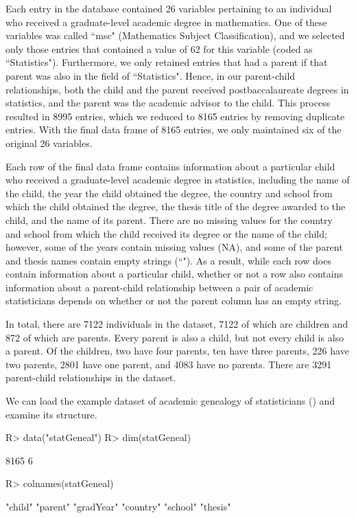 \documentclass[article,shortnames]{jss}
\begin{document}
Each entry in the database contained 26 variables pertaining to an individual who received a graduate-level academic degree in mathematics. One of these variables was called ``msc" (Mathematics Subject Classification), and we selected only those entries that contained a value of 62 for this variable (coded as ``Statistics"). Furthermore, we only retained entries that had a parent if that parent was also in the field of ``Statistics". Hence, in our parent-child relationships, both the child and the parent received postbaccalaureate degrees in statistics, and the parent was the academic advisor to the child. This process resulted in 8995 entries, which we reduced to 8165 entries by removing duplicate entries. With the final data frame of 8165 entries, we only maintained six of the original 26 variables.

Each row of the final data frame contains information about a particular child who received a graduate-level academic degree in statistics, including the name of the child, the year the child obtained the degree, the country and school from which the child obtained the degree, the thesis title of the degree awarded to the child, and the name of its parent. There are no missing values for the country and school from which the child received its degree or the name of the child; however, some of the years contain missing values (NA), and some of the parent and thesis names contain empty strings (``"). As a result, while each row does contain information about a particular child, whether or not a row also contains information about a parent-child relationship between a pair of academic statisticians depends on whether or not the parent column has an empty string.

In total, there are 7122 individuals in the dataset, 7122 of which are children and 872 of which are parents. Every parent is also a child, but not every child is also a parent. Of the children, two have four parents, ten have three parents, 226 have two parents, 2801 have one parent, and 4083 have no parents. There are 3291 parent-child relationships in the dataset.

We can load the example dataset of academic genealogy of statisticians () and examine its structure.

\begin{CodeChunk}
\begin{CodeInput}
R> data("statGeneal")
R> dim(statGeneal)
\end{CodeInput}
\begin{CodeOutput}
[1] 8165    6
\end{CodeOutput}
\begin{CodeInput}
R> colnames(statGeneal)
\end{CodeInput}
\begin{CodeOutput}
[1] "child"    "parent"   "gradYear" "country"  "school"   "thesis"
\end{CodeOutput}
\end{CodeChunk}
\end{document}
